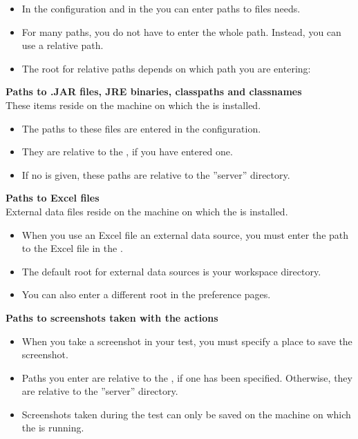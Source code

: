 \begin{itemize}
\item In the \gdaut{} configuration and in the \gdpropview{} you can enter paths to files \app{} needs. 
\item For many paths, you do not have to enter the whole path. Instead, you can use a relative path.
\item The root for relative paths depends on which path you are entering:
\end{itemize}

\textbf{Paths to .JAR files, JRE binaries, classpaths and classnames}\\
These items reside on the machine on which the \gdagent is installed. 
\begin{itemize}
\item The paths to these files are entered in the \gdaut{} configuration. 
\item They are relative to the \gdaut{} , if you have entered one. 
\item If no \gdaut{}  is given, these paths are relative to the ''server'' directory. 
\end{itemize}


\textbf{Paths to Excel files}\\
External data files reside on the machine on which the \ite{} is installed. 
\begin{itemize}
\item When you use an Excel file  an external data source, you  must enter the path to the Excel file in the \gdpropview{}.  
\item The default root for external data sources is your workspace directory.
\item You can also enter a different root in the preference pages. 
\end{itemize}

\textbf{Paths to screenshots taken with the  actions}\\
\begin{itemize}
\item When you take a screenshot in your test, you must specify a place to save the screenshot. 
\item Paths you enter are relative to the \gdaut{} , if one has been specified. Otherwise, they are relative to the ''server'' directory.
\item Screenshots taken during the test can only be saved on the machine on which the \gdagent{} is running. 
\end{itemize}

